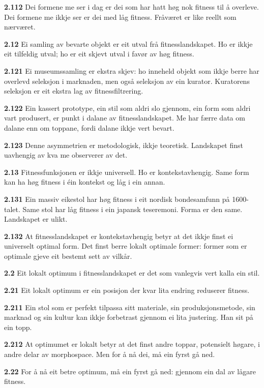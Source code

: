 \documentclass[11pt, a4paper]{article}
\newcommand{\subprop}[1]{\medskip\noindent\textbf{#1}\quad}
\begin{document}
\subprop{2.112} Dei formene me ser i dag er dei som har hatt h\o g nok fitness til \aa{} overleve. Dei formene me ikkje ser er dei med l\aa g fitness. Fr\aa v\ae ret er like reellt som n\ae rv\ae ret.

\subprop{2.12} Ei samling av bevarte objekt er eit utval fr\aa{} fitnesslandskapet. Ho er ikkje eit tilfeldig utval; ho er eit skjevt utval i fav\o r av h\o g fitness.

\subprop{2.121} Ei museumssamling er ekstra skjev: ho inneheld objekt som ikkje berre har overlevd seleksjon i marknaden, men ogs\aa{} seleksjon av ein kurator. Kuratorens seleksjon er eit ekstra lag av fitnessfiltrering.

\subprop{2.122} Ein kassert prototype, ein stil som aldri slo gjennom, ein form som aldri vart produsert, er punkt i dalane av fitnesslandskapet. Me har f\ae rre data om dalane enn om toppane, fordi dalane ikkje vert bevart.

\subprop{2.123} Denne asymmetrien er metodologisk, ikkje teoretisk. Landskapet finst uavhengig av kva me observerer av det.

\subprop{2.13} Fitnessfunksjonen er ikkje universell. Ho er kontekstavhengig. Same form kan ha h\o g fitness i \'ein kontekst og l\aa g i ein annan.

\subprop{2.131} Ein massiv eikestol har h\o g fitness i eit nordisk bondesamfunn p\aa{} 1600-talet. Same stol har l\aa g fitness i ein japansk teseremoni. Forma er den same. Landskapet er ulikt.

\subprop{2.132} At fitnesslandskapet er kontekstavhengig betyr at det ikkje finst ei universelt optimal form. Det finst berre lokalt optimale former: former som er optimale gjeve eit bestemt sett av vilk\aa r.

\subprop{2.2} Eit lokalt optimum i fitnesslandskapet er det som vanlegvis vert kalla ein stil.

\subprop{2.21} Eit lokalt optimum er ein posisjon der kvar lita endring reduserer fitness.

\subprop{2.211} Ein stol som er perfekt tilpassa sitt materiale, sin produksjonsmetode, sin marknad og sin kultur kan ikkje forbetrast gjennom ei lita justering. Han sit p\aa{} ein topp.

\subprop{2.212} At optimumet er lokalt betyr at det finst andre toppar, potensielt h\o gare, i andre delar av morphospace. Men for \aa{} n\aa{} dei, m\aa{} ein fyrst g\aa{} ned.

\subprop{2.22} For \aa{} n\aa{} eit betre optimum, m\aa{} ein fyrst g\aa{} ned: gjennom ein dal av l\aa gare fitness.
\end{document}
